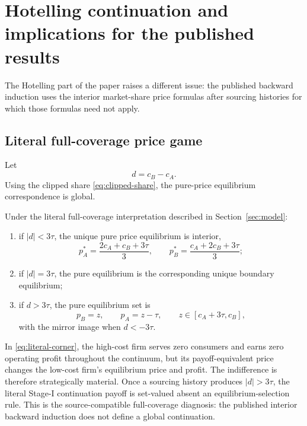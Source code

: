 \section{Hotelling continuation and implications for the published results}
\label{sec:hotelling}

The Hotelling part of the paper raises a different issue: the published backward induction uses the interior market-share price formulas after sourcing histories for which those formulas need not apply.

\subsection{Literal full-coverage price game}

Let
\[
d=c_B-c_A.
\]
Using the clipped share \eqref{eq:clipped-share}, the pure-price equilibrium correspondence is global.

\begin{proposition}
\label{prop:literal-hotelling}
Under the literal full-coverage interpretation described in Section~\ref{sec:model}:
\begin{enumerate}
\item if \(|d|<3\tau\), the unique pure price equilibrium is interior,
\[
p_A^*=\frac{2c_A+c_B+3\tau}{3},
\qquad
p_B^*=\frac{c_A+2c_B+3\tau}{3};
\]
\item if \(|d|=3\tau\), the pure equilibrium is the corresponding unique boundary equilibrium;
\item if \(d>3\tau\), the pure equilibrium set is
\begin{equation}
p_B=z,\qquad p_A=z-\tau,
\qquad
z\in[c_A+3\tau,c_B],
\label{eq:literal-corner}
\end{equation}
with the mirror image when \(d<-3\tau\).
\end{enumerate}
\end{proposition}

In \eqref{eq:literal-corner}, the high-cost firm serves zero consumers and earns zero operating profit throughout the continuum, but its payoff-equivalent price changes the low-cost firm's equilibrium price and profit.  The indifference is therefore strategically material.  Once a sourcing history produces \(|d|>3\tau\), the literal Stage-I continuation payoff is set-valued absent an equilibrium-selection rule.  This is the source-compatible full-coverage diagnosis: the published interior backward induction does not define a global continuation.

